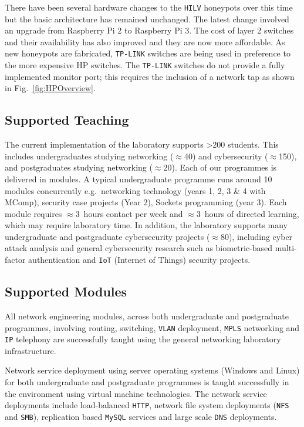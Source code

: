 \documentclass{ieeeaccess}
\begin{document}
There have been several hardware changes to the \texttt{HILV} honeypots over
this time but the basic architecture has remained unchanged. The latest change
involved an upgrade from Raspberry Pi 2 to Raspberry Pi 3. The cost of layer 2
switches and their availability has also improved and they are now more
affordable. As new honeypots are fabricated, \texttt{TP-LINK} switches are being used in
preference to the more expensive HP switches. The \texttt{TP-LINK} switches do not
provide a fully implemented monitor port; this requires the inclusion of a
network tap as shown in Fig.~\ref{fig:HPOverview}.

\subsection{Supported Teaching\label{ResourceSupport}}

The current implementation of the laboratory supports \textgreater200 students. This
includes undergraduates studying networking ($\approx$40) and cybersecurity
($\approx$150), and postgraduates studying networking ($\approx$20). Each of our
programmes is delivered in modules. A typical undergraduate programme runs
around 10 modules concurrently e.g.\ networking technology (years 1, 2, 3 \&
4 with MComp), security case projects (Year 2), Sockets programming (year 3).
Each module requires $\approx$3~hours contact per week and $\approx$3~hours of
directed learning, which may require laboratory time.  In addition, the
laboratory supports many undergraduate and postgraduate cybersecurity projects
($\approx$80), including cyber attack analysis and general cybersecurity research
such as biometric-based multi-factor authentication and \texttt{IoT} (Internet
of Things) security projects.

\subsection{Supported Modules\label{Modules}}

All network engineering modules, across both undergraduate and postgraduate
programmes, involving routing, switching, \texttt{VLAN} deployment,
\texttt{MPLS} networking and \texttt{IP} telephony are successfully taught
using the general networking laboratory infrastructure.

Network service deployment using server operating systems (Windows and Linux)
for both undergraduate and postgraduate programmes is taught successfully in
the environment using virtual machine technologies. The network service
deployments include load-balanced \texttt{HTTP}, network file system
deployments (\texttt{NFS} and \texttt{SMB}), replication based \texttt{MySQL}
services and large scale \texttt{DNS} deployments.
\end{document}
